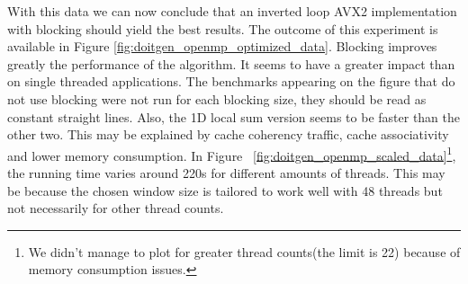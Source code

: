 With this data we can now conclude that an inverted loop AVX2 implementation with blocking should yield the best results. The outcome of this experiment is available in Figure \ref{fig:doitgen_openmp_optimized_data}.
Blocking improves greatly the performance of the algorithm. It seems to have a greater impact than on single threaded applications. The benchmarks appearing on the figure that do not use blocking were not run for each blocking size, they should be read as constant straight lines. Also, the 1D local sum version seems to be faster than the other two. This may be explained by cache coherency traffic, cache associativity and lower memory consumption. In Figure ~\ref{fig:doitgen_openmp_scaled_data}\footnote{We didn't manage to plot for greater thread counts(the limit is 22) because of memory consumption issues.}, the running time varies around 220s for different amounts of threads. This may be because the chosen window size is tailored to work well with 48 threads but not necessarily for other thread counts.